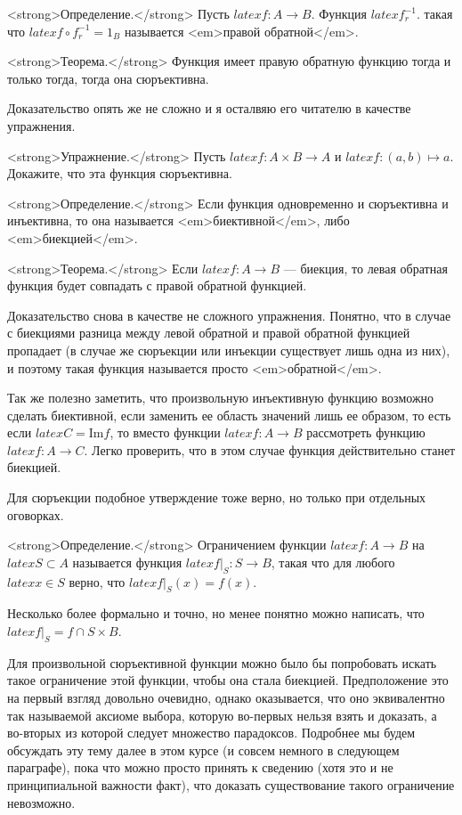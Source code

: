 <strong>Определение.</strong> Пусть $latex f: A\to B$. Функция $latex f^{-1}_r$. такая что $latex f\circ f^{-1}_r = 1_B$ называется <em>правой обратной</em>.

<strong>Теорема.</strong> Функция имеет правую обратную функцию тогда и только тогда, тогда она сюръективна.

Доказательство опять же не сложно и я осталвяю его читателю в качестве упражнения.

<strong>Упражнение.</strong> Пусть $latex f:A \times B \to A$ и $latex f: (a, b)\mapsto a$. Докажите, что эта функция сюръективна.

<strong>Определение.</strong> Если функция одновременно и сюръективна и инъективна, то она называется <em>биективной</em>, либо <em>биекцией</em>.

<strong>Теорема.</strong> Если $latex f: A\to B$ — биекция, то левая обратная функция будет совпадать с правой обратной функцией.

Доказательство снова в качестве не сложного упражнения. Понятно, что в случае с биекциями разница между левой обратной и правой обратной функцией пропадает (в случае же сюръекции или инъекции существует лишь одна из них), и поэтому такая функция называется просто <em>обратной</em>.

Так же полезно заметить, что произвольную инъективную функцию возможно сделать биективной, если заменить ее область значений лишь ее образом, то есть если $latex C = \mathrm{Im} f$, то вместо функции $latex f: A\to B$ рассмотреть функцию $latex f: A \to C$. Легко проверить, что в этом случае функция действительно станет биекцией.

Для сюръекции подобное утверждение тоже верно, но только при отдельных оговорках.

<strong>Определение.</strong> Ограничением функции $latex f: A\to B$ на $latex S\subset A$ называется функция $latex f|_S: S\to B$, такая что для любого $latex x\in S$ верно, что $latex f|_S(x) = f(x)$.

Несколько более формально и точно, но менее понятно можно написать, что $latex f|_S = f \cap S \times B$.

Для произвольной сюръективной функции можно было бы попробовать искать такое ограничение этой функции, чтобы она стала биекцией. Предположение это на первый взгляд довольно очевидно, однако оказывается, что оно эквивалентно так называемой аксиоме выбора, которую во-первых нельзя взять и доказать, а во-вторых из которой следует множество парадоксов. Подробнее мы будем обсуждать эту тему далее в этом курсе (и совсем немного в следующем параграфе), пока что можно просто принять к сведению (хотя это и не принципиальной важности факт), что доказать существование такого ограничение невозможно.

